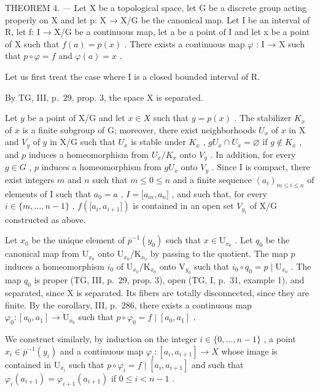 THEOREM 4. --- Let X be a topological space, let G be a discrete group acting properly on X and let p: X → X/G be the canonical map. Let I be an interval of R, let f: I → X/G be a continuous map, let a be a point of I and let x be a point of X such that \(f(a) = p(x)\) . There exists a continuous map \(\varphi\) : I → X such that \(p \circ \varphi = f\) and \(\varphi(a) = x\) .

Let us first treat the case where I is a closed bounded interval of R.

By TG, III, p.~29, prop. 3, the space X is separated.

Let \(y\) be a point of X/G and let \(x \in X\) such that \(y = p(x)\) . The stabilizer \(K_x\) of \(x\) is a finite subgroup of G; moreover, there exist neighborhoods \(U_x\) of \(x\) in X and \(V_y\) of \(y\) in X/G such that \(U_x\) is stable under \(K_x\) , \(gU_x \cap U_x = \varnothing\) if \(g \notin K_x\) , and \(p\) induces a homeomorphism from \(U_x/K_x\) onto \(V_y\) . In addition, for every \(g \in G\) , \(p\) induces a homeomorphism from \(gU_x\) onto \(V_y\) . Since I is compact, there exist integers \(m\) and \(n\) such that \(m \leqslant 0 \leqslant n\) and a finite sequence \((a_i)_{m \leqslant i \leqslant n}\) of elements of I such that \(a_0 = a\) , \(I = {[}a_m,a_n{]}\) , and such that, for every \(i \in \{m, \ldots, n-1\}\) , \(f({[}a_i,a_{i+1}{]})\) is contained in an open set \(V_{y_i}\) of X/G constructed as above.

Let \(x_0\) be the unique element of \(\overline{p}^{-1}(y_0)\) such that \(x \in \mathrm{U}_{x_0}\) . Let \(q_0\) be the canonical map from \(\mathrm{U}_{x_0}\) onto \(\mathrm{U}_{x_0}/\mathrm{K}_{x_0}\) by passing to the quotient. The map \(p\) induces a homeomorphism \(i_0\) of \(\mathrm{U}_{x_0}/\mathrm{K}_{x_0}\) onto \(\mathrm{V}_{y_0}\) such that \(i_0 \circ q_0 = p \mid \mathrm{U}_{x_0}\) . The map \(q_0\) is proper (TG, III, p.~29, prop. 3), open (TG, I, p.~31, example 1), and separated, since X is separated. Its fibers are totally disconnected, since they are finite. By the corollary, III, p.~286, there exists a continuous map \(\varphi_0\colon [a_0,a_1]\to \mathrm{U}_{x_0}\) such that \(p\circ \varphi_0 = f\mid [a_0,a_1]\) .

We construct similarly, by induction on the integer \(i \in \{0, \ldots, n-1\}\) , a point \(x_i \in \overline{p}^{-1}(y_i)\) and a continuous map \(\varphi_i: [a_i, a_{i+1}] \to X\) whose image is contained in \(\mathrm{U}_{x_i}\) such that \(p \circ \varphi_i = f \mid [a_i, a_{i+1}]\) and such that \(\varphi_i(a_{i+1}) = \varphi_{i+1}(a_{i+1})\) if \(0 \leqslant i < n-1\) .

